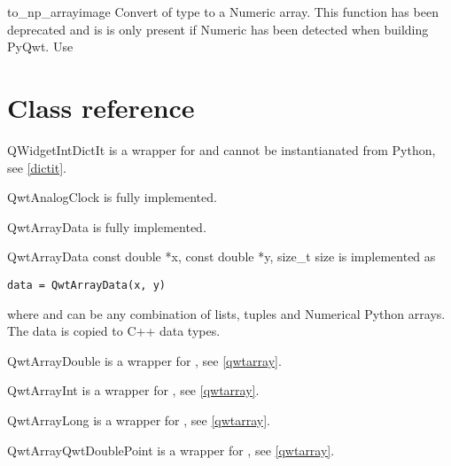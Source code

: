 \documentclass{manual}
\newcommand{\Download}{\ulink{download}
  {http://pyqwt.sourceforge.net/download.html}}
\newcommand{\Future}{
  \begin{notice}[warning]
    The documentation is for the future PyQwt-4.2.2 which is only available
    from CVS. The \Download{} page has links for the latest releases.
  \end{notice}
}
\renewcommand{\Future}{}
\begin{document}
\begin{funcdesc}{to_np_array}{image}
  Convert  of type  to a Numeric array. This function
  has been deprecated and is is only present if Numeric has been detected when
  building PyQwt. Use 
\end{funcdesc}


\section{Class reference \label{classes}}

\Future{}


\begin{classdesc*}{QWidgetIntDictIt}
  is a wrapper for  and cannot be instantianated from
  Python, see \ref{dictit}.
\end{classdesc*}

\begin{classdesc*}{QwtAnalogClock}
  is fully implemented.
\end{classdesc*}

\begin{classdesc*}{QwtArrayData}
  is fully implemented.

  \begin{cfuncdesc}{}{QwtArrayData}{
      const double *x, const double *y, size_t size}
    is implemented as
    \begin{verbatim}
data = QwtArrayData(x, y)
    \end{verbatim}
    where  and  can be any combination of lists, tuples and
    Numerical Python arrays.  The data is copied to C++ data types.
  \end{cfuncdesc}
\end{classdesc*}

\begin{classdesc*}{QwtArrayDouble}
  is a wrapper for , see \ref{qwtarray}.
\end{classdesc*}

\begin{classdesc*}{QwtArrayInt}
  is a wrapper for , see \ref{qwtarray}.
\end{classdesc*}

\begin{classdesc*}{QwtArrayLong}
  is a wrapper for , see \ref{qwtarray}.
\end{classdesc*}

\begin{classdesc*}{QwtArrayQwtDoublePoint}
  is a wrapper for , see \ref{qwtarray}.
\end{classdesc*}
\end{document}
